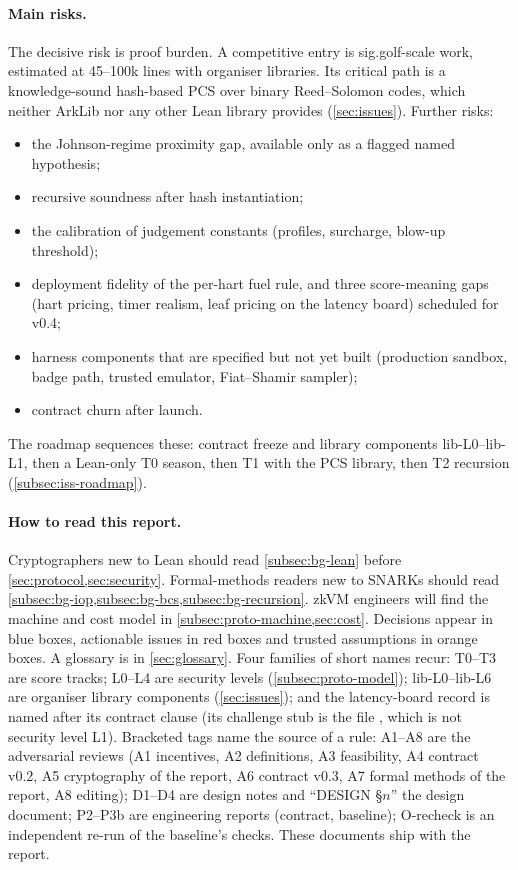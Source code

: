 \paragraph{Main risks.} The decisive risk is proof burden. A competitive entry is sig.golf-scale work,
estimated at 45--100k lines with organiser libraries. Its critical path is a knowledge-sound
hash-based PCS over binary Reed--Solomon codes, which neither ArkLib nor any other Lean library
provides (\cref{sec:issues}). Further risks:
\begin{itemize}[nosep]
\item the Johnson-regime proximity gap, available only as a flagged named hypothesis;
\item recursive soundness after hash instantiation;
\item the calibration of judgement constants (profiles, surcharge, blow-up threshold);
\item deployment fidelity of the per-hart fuel rule, and three score-meaning gaps (hart pricing,
  timer realism, leaf pricing on the latency board) scheduled for v0.4;
\item harness components that are specified but not yet built (production sandbox, badge path,
  trusted emulator, Fiat--Shamir sampler);
\item contract churn after launch.
\end{itemize}
The roadmap sequences these: contract freeze and library components lib-L0--lib-L1, then a Lean-only
T0 season, then T1 with the PCS library, then T2 recursion (\cref{subsec:iss-roadmap}).

\paragraph{How to read this report.} Cryptographers new to Lean should read
\cref{subsec:bg-lean} before \cref{sec:protocol,sec:security}. Formal-methods readers new to SNARKs
should read \cref{subsec:bg-iop,subsec:bg-bcs,subsec:bg-recursion}. zkVM engineers will find the
machine and cost model in \cref{subsec:proto-machine,sec:cost}. Decisions appear in blue boxes,
actionable issues in red boxes and trusted assumptions in orange boxes. A glossary is in
\cref{sec:glossary}. Four families of short names recur: T0--T3 are score tracks; L0--L4 are
security levels (\cref{subsec:proto-model}); lib-L0--lib-L6 are organiser library components
(\cref{sec:issues}); and the latency-board record is named after its contract clause
 (its challenge stub is the file , which is not security level L1).
Bracketed tags name the source of a rule: A1--A8 are the adversarial reviews (A1 incentives, A2
definitions, A3 feasibility, A4 contract v0.2, A5 cryptography of the report, A6 contract v0.3, A7
formal methods of the report, A8 editing); D1--D4 are design notes and \enquote{DESIGN §$n$} the
design document; P2--P3b are engineering reports (contract, baseline); O-recheck is an independent
re-run of the baseline's checks. These documents ship with the report.

